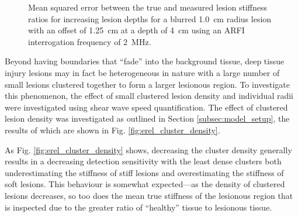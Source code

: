 			\begin{figure}[!htb]
				\centering
				\caption[Shear-wave speed quantified mean squared error related to lesion blurring]{Mean squared error between the true and measured lesion stiffness ratios for increasing lesion depths for a blurred \SI{1.0}{cm} radius lesion with an offset of \SI{1.25}{\cm} at a depth of \SI{4}{\cm} using an ARFI interrogation frequency of \SI{2}{\MHz}.}
				\label{fig:erel_blur_mse}
			\end{figure}

			Beyond having boundaries that ``fade'' into the background tissue, deep tissue injury lesions may in fact be heterogeneous in nature with a large number of small lesions clustered together to form a larger lesionous region. To investigate this phenomenon, the effect of small clustered lesion density and individual radii were investigated using shear wave speed quantification. The effect of clustered lesion density was investigated as outlined in Section \ref{subsec:model_setup}, the results of which are shown in Fig. \ref{fig:erel_cluster_density}. 

			As Fig. \ref{fig:erel_cluster_density} shows, decreasing the cluster density generally results in a decreasing detection sensitivity with the least dense clusters both underestimating the stiffness of stiff lesions and overestimating the stiffness of soft lesions. This behaviour is somewhat expected---as the density of clustered lesions decreases, so too does the mean true stiffness of the lesionous region that is inspected due to the greater ratio of ``healthy'' tissue to lesionous tissue.

